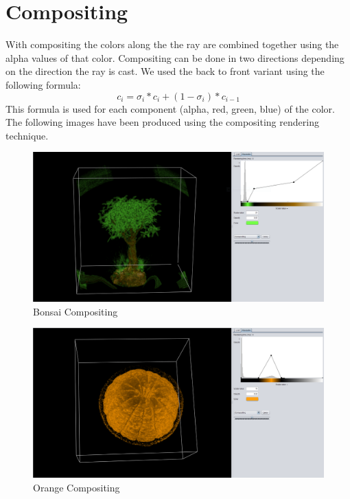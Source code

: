 \documentclass[a4paper,twoside,11pt]{article}
\begin{document}
\section{Compositing}
With compositing the colors along the the ray are combined together using the alpha values of that color. Compositing can be done in two directions depending on the direction the ray is cast.
We used the back to front variant using the following formula:
\begin{equation}\label{Compositing}
  c_i = \sigma_i * c_i + (1 - \sigma_i) * c_{i-1}
\end{equation}
This formula is used for each component (alpha, red, green, blue) of the color.
The following images have been produced using the compositing rendering technique.

\begin{figure}[h!]
    \includegraphics[width=\textwidth]{Images/BonsaiCOMP.png}
    \caption{Bonsai Compositing}
    \label{fig:BonsaiCOMP}
\end{figure}

\begin{figure}[h!]
    \includegraphics[width=\textwidth]{Images/OrangeCOMP.png}
    \caption{Orange Compositing}
    \label{fig:OrangeCOMP}
\end{figure}
\end{document}
